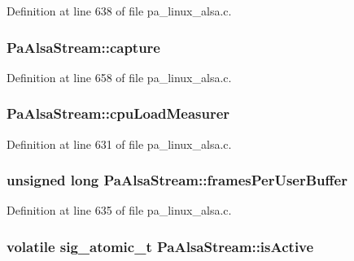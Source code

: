Definition at line 638 of file pa\+\_\+linux\+\_\+alsa.\+c.

\subsubsection[{\texorpdfstring{capture}{capture}}]{ Pa\+Alsa\+Stream\+::capture}\hypertarget{struct_pa_alsa_stream_ad8d739f23295022c802125ef47c142cd}{}\label{struct_pa_alsa_stream_ad8d739f23295022c802125ef47c142cd}


Definition at line 658 of file pa\+\_\+linux\+\_\+alsa.\+c.

\subsubsection[{\texorpdfstring{cpu\+Load\+Measurer}{cpuLoadMeasurer}}]{ Pa\+Alsa\+Stream\+::cpu\+Load\+Measurer}\hypertarget{struct_pa_alsa_stream_a29f7550cda202836040ec8d6dd0d6aea}{}\label{struct_pa_alsa_stream_a29f7550cda202836040ec8d6dd0d6aea}


Definition at line 631 of file pa\+\_\+linux\+\_\+alsa.\+c.

\subsubsection[{\texorpdfstring{frames\+Per\+User\+Buffer}{framesPerUserBuffer}}]{\setlength{\rightskip}{0pt plus 5cm}unsigned long Pa\+Alsa\+Stream\+::frames\+Per\+User\+Buffer}\hypertarget{struct_pa_alsa_stream_a02214e72205abdc3e8cc0564c2e5a8e6}{}\label{struct_pa_alsa_stream_a02214e72205abdc3e8cc0564c2e5a8e6}


Definition at line 635 of file pa\+\_\+linux\+\_\+alsa.\+c.

\subsubsection[{\texorpdfstring{is\+Active}{isActive}}]{\setlength{\rightskip}{0pt plus 5cm}volatile sig\+\_\+atomic\+\_\+t Pa\+Alsa\+Stream\+::is\+Active}\hypertarget{struct_pa_alsa_stream_a6bd474f11d49f98eb08f0558b17b5cd3}{}\label{struct_pa_alsa_stream_a6bd474f11d49f98eb08f0558b17b5cd3}


